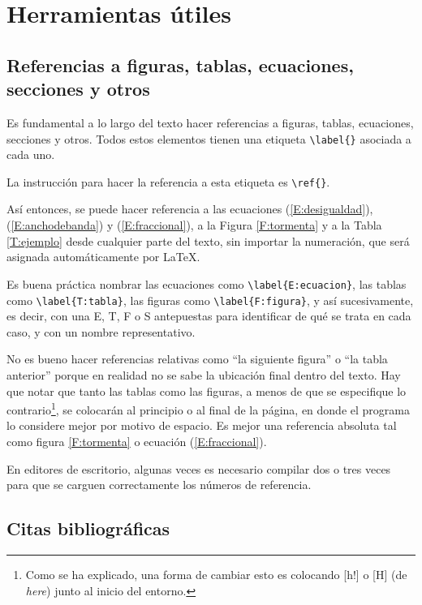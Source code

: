 \section{Herramientas útiles}

\subsection{Referencias a figuras, tablas, ecuaciones, secciones y otros}

Es fundamental a lo largo del texto hacer referencias a figuras, tablas, ecuaciones, secciones y otros. Todos estos elementos tienen una etiqueta \verb+\label{}+ asociada a cada uno. 

La instrucción para hacer la referencia a esta etiqueta es \verb+\ref{}+.

Así entonces, se puede hacer referencia a las ecuaciones (\ref{E:desigualdad}), (\ref{E:anchodebanda}) y (\ref{E:fraccional}), a la Figura \ref{F:tormenta} y a la Tabla \ref{T:ejemplo} desde cualquier parte del texto, sin importar la numeración, que será asignada automáticamente por \LaTeX.

Es buena práctica nombrar las ecuaciones como \verb+\label{E:ecuacion}+, las tablas como \verb+\label{T:tabla}+, las figuras como \verb+\label{F:figura}+, y así sucesivamente, es decir, con una E, T, F o S antepuestas para identificar de qué se trata en cada caso, y con un nombre representativo. 

No es bueno hacer referencias relativas como ``la siguiente figura'' o ``la tabla anterior'' porque en realidad no se sabe la ubicación final dentro del texto. Hay que notar que tanto las tablas como las figuras, a menos de que se especifique lo contrario\footnote{Como se ha explicado, una forma de cambiar esto es colocando [h!] o [H] (de \emph{here}) junto al inicio del entorno.}, se colocarán al principio o al final de la página, en donde el programa lo considere mejor por motivo de espacio. Es mejor una referencia absoluta tal como figura \ref{F:tormenta} o ecuación (\ref{E:fraccional}). 

En editores de escritorio, algunas veces es necesario compilar dos o tres veces para que se carguen correctamente los números de referencia.

\subsection{Citas bibliográficas}
\label{S:citas_bibliograficas}

